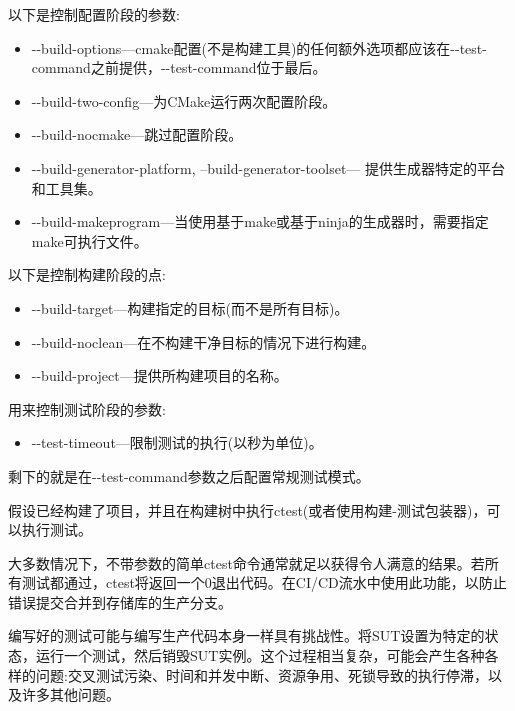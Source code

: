 以下是控制配置阶段的参数:

\begin{itemize}
\item 
-{}-build-options—cmake配置(不是构建工具)的任何额外选项都应该在-{}-test-command之前提供，-{}-test-command位于最后。

\item 
-{}-build-two-config—为CMake运行两次配置阶段。

\item 
-{}-build-nocmake—跳过配置阶段。

\item 
-{}-build-generator-platform, --build-generator-toolset— 提供生成器特定的平台和工具集。

\item 
-{}-build-makeprogram—当使用基于make或基于ninja的生成器时，需要指定make可执行文件。
\end{itemize}

以下是控制构建阶段的点:

\begin{itemize}
\item 
-{}-build-target—构建指定的目标(而不是所有目标)。
	
\item 
-{}-build-noclean—在不构建干净目标的情况下进行构建。
	
\item 
-{}-build-project—提供所构建项目的名称。
\end{itemize}

用来控制测试阶段的参数:

\begin{itemize}
\item 
-{}-test-timeout—限制测试的执行(以秒为单位)。
\end{itemize}

剩下的就是在-{}-test-command参数之后配置常规测试模式。


假设已经构建了项目，并且在构建树中执行ctest(或者使用构建-测试包装器)，可以执行测试。

大多数情况下，不带参数的简单ctest命令通常就足以获得令人满意的结果。若所有测试都通过，ctest将返回一个0退出代码。在CI/CD流水中使用此功能，以防止错误提交合并到存储库的生产分支。

编写好的测试可能与编写生产代码本身一样具有挑战性。将SUT设置为特定的状态，运行一个测试，然后销毁SUT实例。这个过程相当复杂，可能会产生各种各样的问题:交叉测试污染、时间和并发中断、资源争用、死锁导致的执行停滞，以及许多其他问题。

